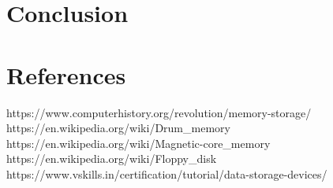 \documentclass{article}
\begin{document}
\section{Conclusion}

\section{References}
https://www.computerhistory.org/revolution/memory-storage/\\
https://en.wikipedia.org/wiki/Drum\_memory\\
https://en.wikipedia.org/wiki/Magnetic-core\_memory\\
https://en.wikipedia.org/wiki/Floppy\_disk\\
https://www.vskills.in/certification/tutorial/data-storage-devices/\\
\end{document}
